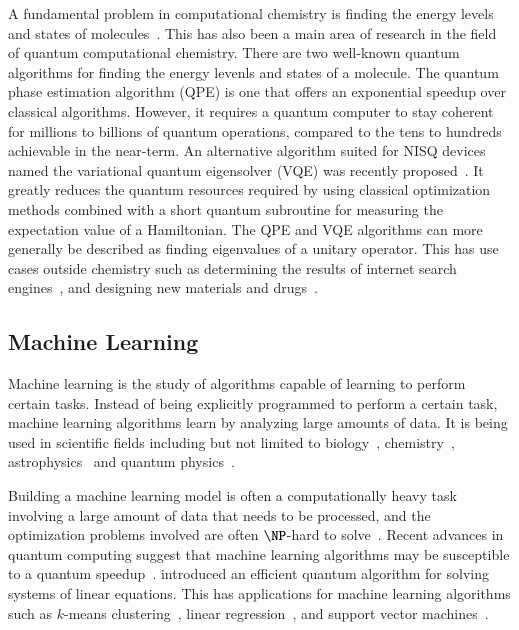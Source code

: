 \documentclass[twocolumn, switch]{article}
\begin{document}
    A fundamental problem in computational chemistry is finding the energy levels and states of molecules~\cite{mcardle2018quantum}.
    This has also been a main area of research in the field of quantum computational chemistry.
    There are two well-known quantum algorithms for finding the energy levenls and states of a molecule.
    The quantum phase estimation algorithm (QPE) is one that offers an exponential speedup over classical algorithms.
    However, it requires a quantum computer to stay coherent for millions to billions of quantum operations, compared to the tens to hundreds achievable in the near-term.
    An alternative algorithm suited for NISQ devices named the variational quantum eigensolver (VQE) was recently proposed~\cite{vqe}.
    It greatly reduces the quantum resources required by using classical optimization methods combined with a short quantum subroutine for measuring the expectation value of a Hamiltonian.
    The QPE and VQE algorithms can more generally be described as finding eigenvalues of a unitary operator.
    This has use cases outside chemistry such as determining the results of internet search engines~\cite{page1999pagerank}, and designing new materials and drugs~\cite{golub2000eigenvalue}.
    
    \subsection{Machine Learning}
    Machine learning is the study of algorithms capable of learning to perform certain tasks.
    Instead of being explicitly programmed to perform a certain task, machine learning algorithms learn by analyzing large amounts of data.
    It is being used in scientific fields including but not limited to biology~\cite{baldi2001bioinformatics}, chemistry~\cite{noordik2004cheminformatics}, astrophysics~\cite{baron2019machine} and quantum physics~\cite{torlai2017many}.
    
    Building a machine learning model is often a computationally heavy task involving a large amount of data that needs to be processed, and the optimization problems involved are often $\NP$-hard to solve~\cite{jain2017non}.
    Recent advances in quantum computing suggest that machine learning algorithms may be susceptible to a quantum speedup~\cite{lee2019experimental, gao2018quantum, yoo2014quantum, biamonte2017quantum}.
    \textcite{harrow2009quantum} introduced an efficient quantum algorithm for solving systems of linear equations.
    This has applications for machine learning algorithms such as $k$-means clustering~\cite{lloyd2013quantum}, linear regression~\cite{schuld2016prediction, yu2017improved}, and support vector machines~\cite{rebentrost2014quantum}.
    
\end{document}
